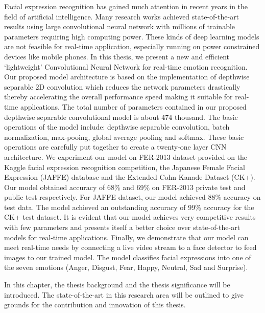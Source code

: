 \documentclass[master]{thesis-uestc}
\begin{document}
\begin{englishabstract}
Facial expression recognition has gained much attention in recent years in the field of artificial intelligence. Many research works achieved state-of-the-art results using large convolutional neural network with millions of trainable parameters requiring high computing power. These kinds of deep learning models are not feasible for real-time application, especially running on power constrained devices like mobile phones. In this thesis, we present a new and efficient `lightweight' Convolutional Neural Network for real-time emotion recognition. Our proposed model architecture is based on the implementation of depthwise separable 2D convolution which reduces the network parameters drastically thereby accelerating the overall performance speed making it suitable for real-time applications. The total number of parameters contained in our proposed depthwise separable convolutional model is about 474 thousand. The basic operations of the model include: depthwise separable convolution, batch normalization, max-pooing, global average pooling and softmax. These basic operations are carefully put together to create a twenty-one layer CNN architecture. We experiment our model on FER-2013 dataset provided on the Kaggle facial expression recognition competition, the Japanese Female Facial Expression (JAFFE) database and the Extended Cohn-Kanade Dataset (CK+). Our model obtained accuracy of 68\% and 69\% on FER-2013 private test and public test respectively. For JAFFE dataset, our model achieved 88\% accuracy on test data. The model achieved an outstanding accuracy of 99\% accuracy for the CK+ test dataset. It is evident that our model achieves very competitive results with few parameters and presents itself a better choice over state-of-the-art models for real-time applications. Finally, we demonstrate that our model can meet real-time needs by connecting a live video stream to a face detector to feed images to our trained model. The model classifies facial expressions into one of the seven emotions (Anger, Disgust, Fear, Happy, Neutral, Sad and Surprise).


\end{englishabstract}

\thesistableofcontents

\thesischapterexordium

In this chapter, the thesis background and the thesis significance will be introduced. The state-of-the-art in this research area will be outlined to give grounds for the contribution and innovation of this thesis. 
\end{document}
